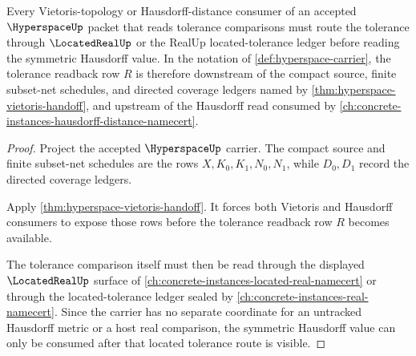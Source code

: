 \begin{lemma}
\label{thm:hyperspace-vietoris-located-real-dependency}
Every Vietoris-topology or Hausdorff-distance consumer of an accepted $\HyperspaceUp$ packet that reads tolerance comparisons must route the tolerance through $\LocatedRealUp$ or the RealUp located-tolerance ledger before reading the symmetric Hausdorff value. In the notation of \autoref{def:hyperspace-carrier}, the tolerance readback row $R$ is therefore downstream of the compact source, finite subset-net schedules, and directed coverage ledgers named by \autoref{thm:hyperspace-vietoris-handoff}, and upstream of the Hausdorff read consumed by \autoref{ch:concrete-instances-hausdorff-distance-namecert}.
\end{lemma}
\begin{proof}
Project the accepted $\HyperspaceUp$ carrier. The compact source and finite subset-net schedules are the rows $X,K_0,K_1,N_0,N_1$, while $D_0,D_1$ record the directed coverage ledgers.

Apply \autoref{thm:hyperspace-vietoris-handoff}. It forces both Vietoris and Hausdorff consumers to expose those rows before the tolerance readback row $R$ becomes available.

The tolerance comparison itself must then be read through the displayed $\LocatedRealUp$ surface of \autoref{ch:concrete-instances-located-real-namecert} or through the located-tolerance ledger sealed by \autoref{ch:concrete-instances-real-namecert}. Since the carrier has no separate coordinate for an untracked Hausdorff metric or a host real comparison, the symmetric Hausdorff value can only be consumed after that located tolerance route is visible.
\end{proof}
